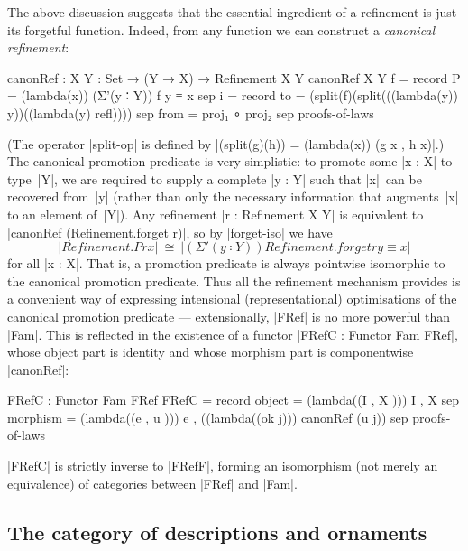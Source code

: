 The above discussion suggests that the essential ingredient of a refinement is just its forgetful function.
Indeed, from any function we can construct a \emph{canonical refinement}:
\begin{code}
canonRef : {X Y : Set} → (Y → X) → Refinement X Y
canonRef {X} {Y} f = record
  {    P  =  (lambda(x)) (Σ'(y ∶ Y)) f y ≡ x
  sep  i  =  record  {    to    =  (split(f)(split(((lambda(y)) y))((lambda(y) refl))))
                     sep  from  =  proj₁ ∘ proj₂
                     sep  proofs-of-laws } }
\end{code}
(The operator |split-op| is defined by |(split(g)(h)) = (lambda(x)) (g x , h x)|.)
The canonical promotion predicate is very simplistic: to promote some |x : X| to type~|Y|, we are required to supply a complete |y : Y| such that |x|~can be recovered from~|y| (rather than only the necessary information that augments~|x| to an element of~|Y|).
Any refinement |r : Refinement X Y| is equivalent to |canonRef (Refinement.forget r)|, so by |forget-iso| we have
\[ |Refinement.P r x| ~\cong~ |(Σ'(y ∶ Y)) Refinement.forget r y ≡ x| \]
for all |x : X|.
That is, a promotion predicate is always pointwise isomorphic to the canonical promotion predicate.
Thus all the refinement mechanism provides is a convenient way of expressing intensional (representational) optimisations of the canonical promotion predicate --- extensionally, |FRef| is no more powerful than |Fam|.
This is reflected in the existence of a functor |FRefC : Functor Fam FRef|, whose object part is identity and whose morphism part is componentwise |canonRef|:
\begin{code}
FRefC : Functor Fam FRef
FRefC = record
  {    object    =  (lambda((I , X  ))) I , X
  sep  morphism  =  (lambda((e , u  ))) e , ((lambda((ok j))) canonRef (u {j}))
  sep  proofs-of-laws }
\end{code}
|FRefC| is strictly inverse to |FRefF|, forming an isomorphism (not merely an equivalence) of categories between |FRef| and |Fam|.

\subsection{The category of descriptions and ornaments}
\label{sec:Orn}

